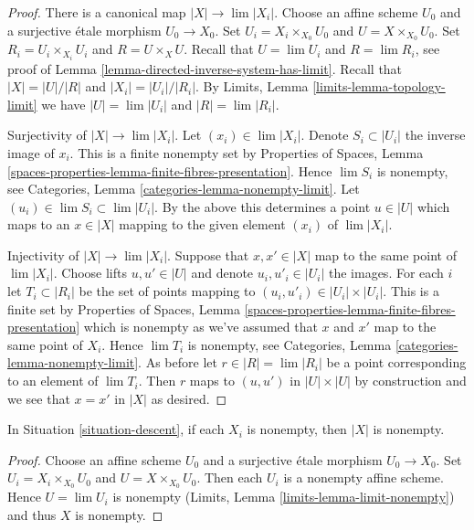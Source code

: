 \begin{proof}
There is a canonical map $|X| \to \lim |X_i|$.
Choose an affine scheme $U_0$ and a surjective \'etale morphism $U_0 \to X_0$.
Set $U_i = X_i \times_{X_0} U_0$ and $U = X \times_{X_0} U_0$.
Set $R_i = U_i \times_{X_i} U_i$ and $R = U \times_X U$.
Recall that $U = \lim U_i$ and $R = \lim R_i$, see proof of
Lemma \ref{lemma-directed-inverse-system-has-limit}.
Recall that $|X| = |U|/|R|$ and $|X_i| = |U_i|/|R_i|$. By
Limits, Lemma \ref{limits-lemma-topology-limit} we have $|U| = \lim |U_i|$ and
$|R| = \lim |R_i|$.

\medskip\noindent
Surjectivity of $|X| \to \lim |X_i|$. Let $(x_i) \in \lim |X_i|$. Denote
$S_i \subset |U_i|$ the inverse image of $x_i$. This is a finite nonempty
set by Properties of Spaces, Lemma
\ref{spaces-properties-lemma-finite-fibres-presentation}.
Hence $\lim S_i$ is nonempty, see
Categories, Lemma \ref{categories-lemma-nonempty-limit}.
Let $(u_i) \in \lim S_i \subset \lim |U_i|$. By the above this determines
a point $u \in |U|$ which maps to an $x \in |X|$ mapping to the given
element $(x_i)$ of $\lim |X_i|$.

\medskip\noindent
Injectivity of $|X| \to \lim |X_i|$. Suppose that $x, x' \in |X|$
map to the same point of $\lim |X_i|$. Choose lifts $u, u' \in |U|$
and denote $u_i, u'_i \in |U_i|$ the images.
For each $i$ let $T_i \subset |R_i|$ be the set of points mapping
to $(u_i, u'_i) \in |U_i| \times |U_i|$. This is a finite
set by Properties of Spaces, Lemma
\ref{spaces-properties-lemma-finite-fibres-presentation}
which is nonempty as we've assumed that $x$ and $x'$ map to the
same point of $X_i$. Hence $\lim T_i$ is nonempty, see
Categories, Lemma \ref{categories-lemma-nonempty-limit}.
As before let $r \in |R| = \lim |R_i|$ be a point corresponding to an
element of $\lim T_i$. Then $r$ maps to $(u, u')$ in $|U| \times |U|$
by construction and we see that $x = x'$ in $|X|$ as desired.
\end{proof}

\begin{lemma}
\label{lemma-limit-nonempty}
In Situation \ref{situation-descent}, if each $X_i$ is nonempty, then
$|X|$ is nonempty.
\end{lemma}

\begin{proof}
Choose an affine scheme $U_0$ and a surjective \'etale morphism $U_0 \to X_0$.
Set $U_i = X_i \times_{X_0} U_0$ and $U = X \times_{X_0} U_0$.
Then each $U_i$ is a nonempty affine scheme. Hence $U = \lim U_i$
is nonempty (Limits, Lemma \ref{limits-lemma-limit-nonempty}) and thus
$X$ is nonempty.
\end{proof}

